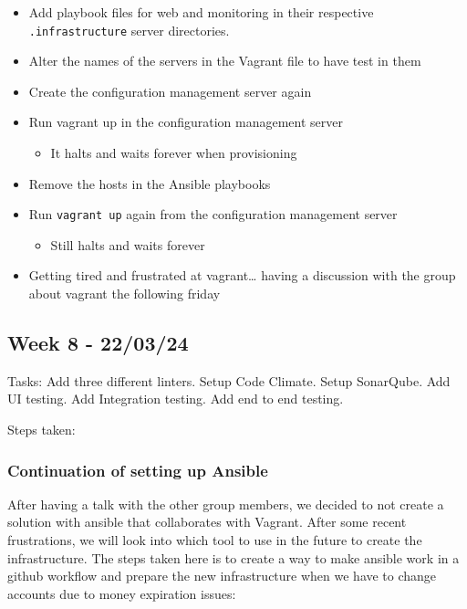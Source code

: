 \begin{itemize}
    \item Add playbook files for web and monitoring in their respective \texttt{.infrastructure} server directories.
    \item Alter the names of the servers in the Vagrant file to have test in them
    \item Create the configuration management server again
    \item Run vagrant up in the configuration management server

    \begin{itemize}
        \item It halts and waits forever when provisioning
    \end{itemize}
    \item Remove the hosts in the Ansible playbooks
    \item Run \texttt{vagrant\ up} again from the configuration management server

    \begin{itemize}
        \item Still halts and waits forever
    \end{itemize}
    \item Getting tired and frustrated at vagrant\ldots{} having a discussion with the group about vagrant the following friday
\end{itemize}

\subsection{Week 8 - 22/03/24}
\label{log:week8}

Tasks: Add three different linters. Setup Code Climate. Setup SonarQube.
Add UI testing. Add Integration testing. Add end to end testing.

Steps taken:

\subsubsection{Continuation of setting up Ansible}
\label{log:continuation-of-setting-up-ansible}

After having a talk with the other group members, we decided to not
create a solution with ansible that collaborates with Vagrant. After
some recent frustrations, we will look into which tool to use in the
future to create the infrastructure. The steps taken here is to create a
way to make ansible work in a github workflow and prepare the new
infrastructure when we have to change accounts due to money expiration
issues:

